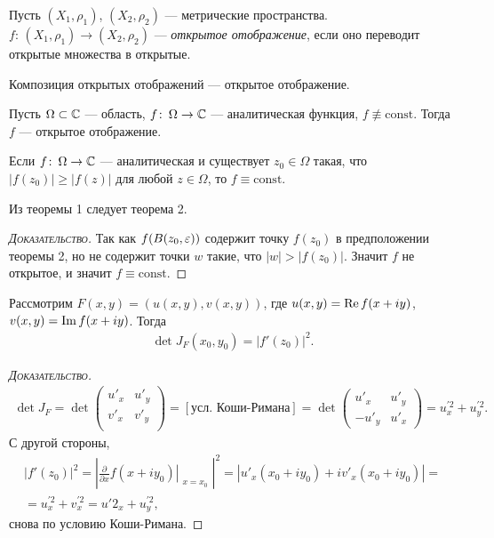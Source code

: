 \documentclass[../../main.tex]{subfiles}
\begin{document}
\begin{df}
 Пусть $ (X_1,\rho_1) $, $ (X_2,\rho_2) $ --- метрические пространства.
 $ f \colon\, (X_1,\rho_1) \to (X_2, \rho_2)   $ --- \textit{открытое отображение}, если оно переводит открытые множества в открытые.
\end{df}
\begin{remrk}
 Композиция открытых отображений --- открытое отображение.
\end{remrk}
\begin{thm}
 Пусть $ \Omega \subset \mathbb{C}$ --- область, $ f \colon\, \Omega \to \mathbb{C}  $  --- аналитическая функция, $ f \not\equiv \mathrm{const} $. Тогда $ f $ --- открытое отображение.
\end{thm}
\begin{thm}
 Если $ f \colon\, \Omega \to \mathbb{C} $ --- аналитическая и существует $ z_0 \in \Omega $ такая, что $ \left| f(z_0) \right| \geqslant \left| f(z) \right| $ для любой $ z \in \Omega $, то $ f \equiv \mathrm{const} $.
\end{thm}
\begin{prop}
 Из теоремы 1 следует теорема 2.
\end{prop}
\begin{proof}[\normalfont\textsc{Доказательство}]
 Так как $ f(B(z_0, \varepsilon)) $ содержит точку $ f(z_0) $ в предположении теоремы 2, но не содержит точки $ w $ такие, что $ \left| w \right| > \left| f(z_0) \right| $. Значит $ f $ не открытое, и значит $ f \equiv \mathrm{const} $.
\end{proof}
\begin{lm}
 Рассмотрим $ F(x, y) = (u(x,y), v(x,y)) $, где $ u(x,y) = \operatorname{Re} f(x + iy) $, $ v(x,y) = \operatorname{Im} f(x +iy) $. Тогда
 \begin{align*}
  \det J_F (x_0, y_0) = \left| f'(z_0) \right|^{2}.
 \end{align*}
\end{lm}
\begin{proof}[\normalfont\textsc{Доказательство}]
 \begin{align*}
  \det J_F = \det \begin{pmatrix}
   u'_x & u'_y \\
   v'_x & v'_y \\
  \end{pmatrix} = [\text{усл. Коши-Римана}] = \det \begin{pmatrix}
  u'_x & u'_y \\
  -u'_y & u'_x
  \end{pmatrix} = u^{'2}_x + u^{'2}_y.
 \end{align*} С другой стороны,
 \begin{align*}
  \left| f'(z_0) \right|^{2} = \left| \left. \frac{\partial}{\partial x}f(x + iy_0) \right|_{\substack{x = x_0}}  \right|^{2} = \left| u'_x(x_0 + iy_0) + iv'_x(x_0 + iy_0) \right| = \\
   = u^{'2}_x + v^{'2}_x = u{'2}_x + u^{'2}_y,
 \end{align*} снова по условию Коши-Римана.
\end{proof}
\end{document}
